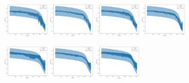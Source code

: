 \documentclass{beamer}
\begin{document}
\begin{frame}
	\begin{figure}[htbp]
		\centering
			{\label{fig:subfig1}\includegraphics[width=0.2\textwidth]{figures/soh_vitq/tri_group1_cell1_cnn_vit.jpg}}
			{\label{fig:subfig2}\includegraphics[width=0.2\textwidth]{figures/soh_vitq/tri_group1_cell1_cnn_viq.jpg}}
			{\label{fig:subfig3}\includegraphics[width=0.2\textwidth]{figures/soh_vitq/tri_group1_cell1_cnn_vit_trans.jpg}}
			{\label{fig:subfig4}\includegraphics[width=0.2\textwidth]{figures/soh_vitq/tri_group1_cell1_cnn_viq_trans.jpg}}
	\end{figure}
	\begin{figure}[htbp]
		\centering
			{\label{fig:subfig1}\includegraphics[width=0.2\textwidth]{figures/soh_vitq/tri_group1_cell2_cnn_vit.jpg}}
			{\label{fig:subfig2}\includegraphics[width=0.2\textwidth]{figures/soh_vitq/tri_group1_cell2_cnn_viq.jpg}}
			{\label{fig:subfig3}\includegraphics[width=0.2\textwidth]{figures/soh_vitq/tri_group1_cell2_cnn_vit_trans.jpg}}

\end{figure}
\end{frame}
\end{document}
